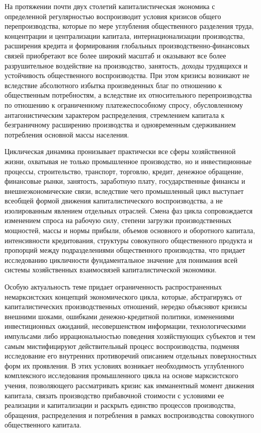 На протяжении почти двух столетий капиталистическая экономика с определенной регулярностью воспроизводит условия кризисов общего перепроизводства, которые по мере углубления общественного разделения труда, концентрации и централизации капитала, интернационализации производства, расширения кредита и формирования глобальных производственно-финансовых связей приобретают все более широкий масштаб и оказывают все более разрушительное воздействие на производство, занятость, доходы трудящихся и устойчивость общественного воспроизводства. При этом кризисы возникают не вследствие абсолютного избытка произведенных благ по отношению к общественным потребностям, а вследствие их относительного перепроизводства по отношению к ограниченному платежеспособному спросу, обусловленному антагонистическим характером распределения, стремлением капитала к безграничному расширению производства и одновременным сдерживанием потребления основной массы населения.

Циклическая динамика пронизывает практически все сферы хозяйственной жизни, охватывая не только промышленное производство, но и инвестиционные процессы, строительство, транспорт, торговлю, кредит, денежное обращение, финансовые рынки, занятость, заработную плату, государственные финансы и внешнеэкономические связи, вследствие чего промышленный цикл выступает всеобщей формой движения капиталистического воспроизводства, а не изолированным явлением отдельных отраслей. Смена фаз цикла сопровождается изменением спроса на рабочую силу, степени загрузки производственных мощностей, массы и нормы прибыли, объемов основного и оборотного капитала, интенсивности кредитования, структуры совокупного общественного продукта и пропорций между подразделениями общественного производства, что придает исследованию цикличности фундаментальное значение для понимания всей системы хозяйственных взаимосвязей капиталистической экономики.

Особую актуальность теме придает ограниченность распространенных немарксистских концепций экономического цикла, которые, абстрагируясь от капиталистических производственных отношений, нередко объясняют кризисы внешними шоками, ошибками денежно-кредитной политики, изменениями инвестиционных ожиданий, несовершенством информации, технологическими импульсами либо иррациональностью поведения хозяйствующих субъектов и тем самым мистифицируют действительный процесс воспроизводства, подменяя исследование его внутренних противоречий описанием отдельных поверхностных форм их проявления. В этих условиях возникает необходимость углубленного комплексного исследования промышленного цикла на основе марксистского учения, позволяющего рассматривать кризис как имманентный момент движения капитала, связать производство прибавочной стоимости с условиями ее реализации и капитализации и раскрыть единство процессов производства, обращения, распределения и потребления в рамках воспроизводства совокупного общественного капитала.

